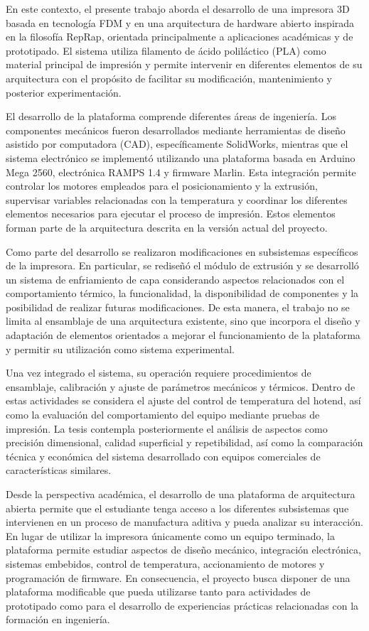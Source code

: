 En este contexto, el presente trabajo aborda el desarrollo de una impresora 3D basada en tecnología FDM y en una arquitectura de hardware abierto inspirada en la filosofía RepRap, orientada principalmente a aplicaciones académicas y de prototipado. El sistema utiliza filamento de ácido poliláctico (PLA) como material principal de impresión y permite intervenir en diferentes elementos de su arquitectura con el propósito de facilitar su modificación, mantenimiento y posterior experimentación.

El desarrollo de la plataforma comprende diferentes áreas de ingeniería. Los componentes mecánicos fueron desarrollados mediante herramientas de diseño asistido por computadora (CAD), específicamente SolidWorks, mientras que el sistema electrónico se implementó utilizando una plataforma basada en Arduino Mega 2560, electrónica RAMPS 1.4 y firmware Marlin. Esta integración permite controlar los motores empleados para el posicionamiento y la extrusión, supervisar variables relacionadas con la temperatura y coordinar los diferentes elementos necesarios para ejecutar el proceso de impresión. Estos elementos forman parte de la arquitectura descrita en la versión actual del proyecto.

Como parte del desarrollo se realizaron modificaciones en subsistemas específicos de la impresora. En particular, se rediseñó el módulo de extrusión y se desarrolló un sistema de enfriamiento de capa considerando aspectos relacionados con el comportamiento térmico, la funcionalidad, la disponibilidad de componentes y la posibilidad de realizar futuras modificaciones. De esta manera, el trabajo no se limita al ensamblaje de una arquitectura existente, sino que incorpora el diseño y adaptación de elementos orientados a mejorar el funcionamiento de la plataforma y permitir su utilización como sistema experimental.

Una vez integrado el sistema, su operación requiere procedimientos de ensamblaje, calibración y ajuste de parámetros mecánicos y térmicos. Dentro de estas actividades se considera el ajuste del control de temperatura del hotend, así como la evaluación del comportamiento del equipo mediante pruebas de impresión. La tesis contempla posteriormente el análisis de aspectos como precisión dimensional, calidad superficial y repetibilidad, así como la comparación técnica y económica del sistema desarrollado con equipos comerciales de características similares.

Desde la perspectiva académica, el desarrollo de una plataforma de arquitectura abierta permite que el estudiante tenga acceso a los diferentes subsistemas que intervienen en un proceso de manufactura aditiva y pueda analizar su interacción. En lugar de utilizar la impresora únicamente como un equipo terminado, la plataforma permite estudiar aspectos de diseño mecánico, integración electrónica, sistemas embebidos, control de temperatura, accionamiento de motores y programación de firmware. En consecuencia, el proyecto busca disponer de una plataforma modificable que pueda utilizarse tanto para actividades de prototipado como para el desarrollo de experiencias prácticas relacionadas con la formación en ingeniería.

